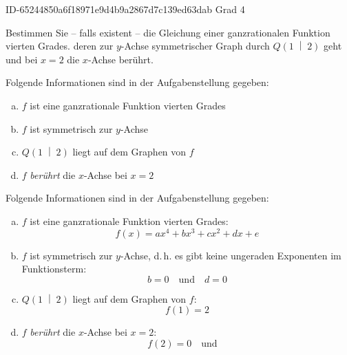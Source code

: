 \begin{exercise}
      {ID-65244850a6f18971e9d4b9a2867d7c139ed63dab}
      {Grad 4}
  \ifproblem\problem\par
    Bestimmen Sie -- falls existent -- die Gleichung
    einer ganzrationalen Funktion vierten Grades.
    deren zur $y$-Achse symmetrischer Graph durch
    $Q\left(1\;\middle|\;2\right)$ geht und bei
    $x=2$ die $x$-Achse berührt.
  \fi
  \ifoutline\outline\par
    Folgende Informationen sind in der
    Aufgabenstellung gegeben:
    \begin{enumerate}[a)]
      \item $f$ ist eine ganzrationale Funktion
            vierten Grades
      \item $f$ ist symmetrisch zur $y$-Achse
      \item $Q\left(1\;\middle|\;2\right)$ liegt
            auf dem Graphen von $f$
      \item $f$ \emph{berührt} die $x$-Achse bei
            $x=2$
    \end{enumerate}
  \fi
  \ifoutcome\outcome\par
    Folgende Informationen sind in der
    Aufgabenstellung gegeben:
    \begin{enumerate}[a)]
      \item $f$ ist eine ganzrationale Funktion
            vierten Grades:
            \begin{equation*}
              f(x)=ax^4+bx^3+cx^2+dx+e
            \end{equation*}
      \item $f$ ist symmetrisch zur $y$-Achse,
            d.\,h. es gibt keine ungeraden
            Exponenten im Funktionsterm:
            \begin{equation*}
              b=0
              \quad\text{und}\quad
              d=0
            \end{equation*}
      \item $Q\left(1\;\middle|\;2\right)$ liegt
            auf dem Graphen von $f$:
            \begin{equation*}
              f(1)=2
            \end{equation*}
      \item $f$ \emph{berührt} die $x$-Achse bei
            $x=2$:
            \begin{equation*}
              f(2)=0
              \quad\text{und}\quad

\end{equation*}
\end{enumerate}
\end{exercise}
